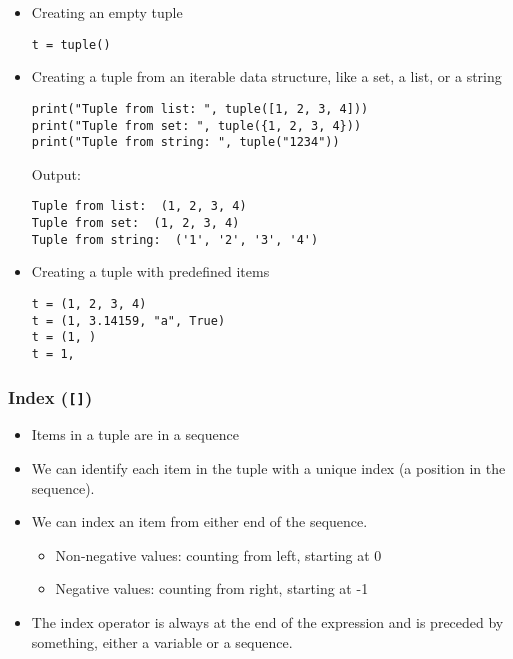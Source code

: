 \documentclass[11pt]{article}
\begin{document}
\begin{itemize}
\item Creating an empty tuple
\begin{verbatim}
t = tuple()
\end{verbatim}

\item Creating a tuple from an iterable data structure, like a set, a list, or a string

\begin{verbatim}
print("Tuple from list: ", tuple([1, 2, 3, 4]))
print("Tuple from set: ", tuple({1, 2, 3, 4}))
print("Tuple from string: ", tuple("1234"))
\end{verbatim}

 \noindent Output:

\begin{verbatim}
Tuple from list:  (1, 2, 3, 4)
Tuple from set:  (1, 2, 3, 4)
Tuple from string:  ('1', '2', '3', '4')
\end{verbatim}

\item Creating a tuple with predefined items
\begin{verbatim}
t = (1, 2, 3, 4)
t = (1, 3.14159, "a", True)
t = (1, )
t = 1,
\end{verbatim}
\end{itemize}

\subsubsection{Index (\texttt{[]})}
\label{sec:org0009d78}
\begin{itemize}
\item Items in a tuple are in a sequence
\item We can identify each item in the tuple with a unique index (a position in the sequence).
\item We can index an item from either end of the sequence.
\begin{itemize}
\item Non-negative values: counting from left, starting at 0
\item Negative values: counting from right, starting at -1
\end{itemize}
\item The index operator is always at the end of the expression and is preceded by something, either a variable or a sequence.
\end{itemize}
\end{document}

